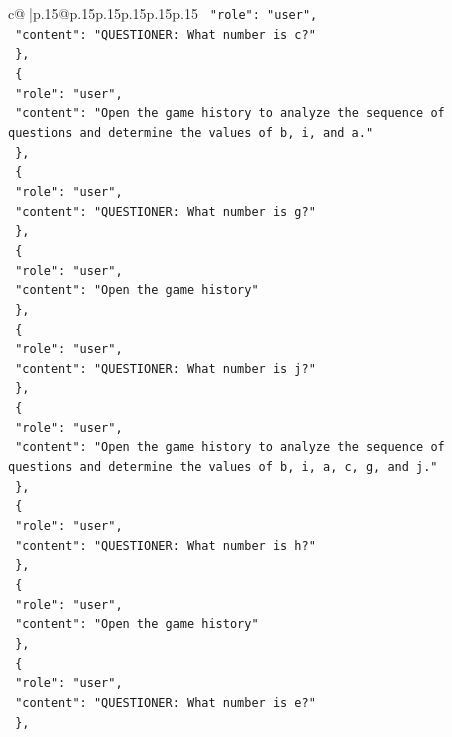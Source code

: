 \documentclass{article}
\begin{document}
{\begin{supertabular}{c@{$\;$}|p{.15\linewidth}@{}p{.15\linewidth}p{.15\linewidth}p{.15\linewidth}p{.15\linewidth}p{.15\linewidth}}
{{{\texttt{    "role": "user",} \\
\texttt{    "content": "QUESTIONER: What number is c?"} \\
\texttt{  \},} \\
\texttt{  \{} \\
\texttt{    "role": "user",} \\
\texttt{    "content": "Open the game history to analyze the sequence of questions and determine the values of b, i, and a."} \\
\texttt{  \},} \\
\texttt{  \{} \\
\texttt{    "role": "user",} \\
\texttt{    "content": "QUESTIONER: What number is g?"} \\
\texttt{  \},} \\
\texttt{  \{} \\
\texttt{    "role": "user",} \\
\texttt{    "content": "Open the game history"} \\
\texttt{  \},} \\
\texttt{  \{} \\
\texttt{    "role": "user",} \\
\texttt{    "content": "QUESTIONER: What number is j?"} \\
\texttt{  \},} \\
\texttt{  \{} \\
\texttt{    "role": "user",} \\
\texttt{    "content": "Open the game history to analyze the sequence of questions and determine the values of b, i, a, c, g, and j."} \\
\texttt{  \},} \\
\texttt{  \{} \\
\texttt{    "role": "user",} \\
\texttt{    "content": "QUESTIONER: What number is h?"} \\
\texttt{  \},} \\
\texttt{  \{} \\
\texttt{    "role": "user",} \\
\texttt{    "content": "Open the game history"} \\
\texttt{  \},} \\
\texttt{  \{} \\
\texttt{    "role": "user",} \\
\texttt{    "content": "QUESTIONER: What number is e?"} \\
\texttt{  \},} \\
}}}
\end{supertabular}}
\end{document}

